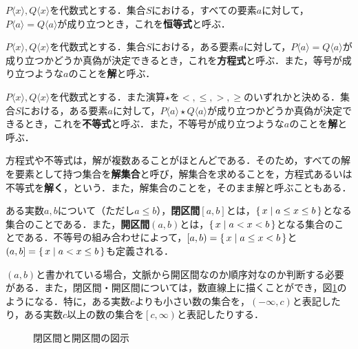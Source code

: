 \begin{definition}[恒等式]
	$P\langle x\rangle, Q\langle x\rangle$を代数式とする．集合$S$における，すべての要素$a$に対して，$P\langle a\rangle = Q\langle a\rangle$が成り立つとき，これを\textbf{恒等式}と呼ぶ．
\end{definition}
\begin{definition}[方程式]
	$P\langle x\rangle, Q\langle x\rangle$を代数式とする．集合$S$における，ある要素$a$に対して，$P\langle a\rangle = Q\langle a\rangle$が成り立つかどうか真偽が決定できるとき，これを\textbf{方程式}と呼ぶ．また，等号が成り立つような$a$のことを\textbf{解}と呼ぶ．
\end{definition}
\begin{definition}[不等式]
	$P\langle x\rangle, Q\langle x\rangle$を代数式とする．また演算$\star$を$<, \leq, >, \geq$のいずれかと決める．集合$S$における，ある要素$a$に対して，$P\langle a\rangle \star Q\langle a\rangle$が成り立つかどうか真偽が決定できるとき，これを\textbf{不等式}と呼ぶ．また，不等号が成り立つような$a$のことを\textbf{解}と呼ぶ．
\end{definition}
\begin{rem*}
	方程式や不等式は，解が複数あることがほとんどである．そのため，すべての解を要素として持つ集合を\textbf{解集合}と呼び，解集合を求めることを，方程式あるいは不等式を\textbf{解く}，という\footnotemark[2]．また，解集合のことを，そのまま解と呼ぶこともある．
\end{rem*}
\begin{definition}
	ある実数$a, b$について（ただし$a \leq b$），\textbf{閉区間}$\left[a, b\right]$とは，$\left\{\,x \mid a \leq x \leq b\,\right\}$となる集合のことである．また，\textbf{開区間}$\left(a, b\right)$とは，$\left\{\,x \mid a < x < b\,\right\}$となる集合のことである．不等号の組み合わせによって，$\left[a, b\right) = \left\{\,x \mid a \leq x < b\,\right\}$と$\left(a, b\right] = \left\{\,x \mid a < x \leq b\,\right\}$も定義される．
\end{definition}
\begin{rem*}
	$\left(a, b\right)$と書かれている場合，文脈から開区間なのか順序対なのか判断する必要がある．また，閉区間・開区間については，数直線上に描くことができ，図\ref{fig:interval}のようになる．特に，ある実数$c$よりも小さい数の集合を，$\left(-\infty, c\right)$と表記したり，ある実数$c$以上の数の集合を$\left[c, \infty\right)$と表記したりする．
	
	\vfill
	\begin{figure}[!h]
		\caption{閉区間と開区間の図示}
		\label{fig:interval}
	\end{figure}
\end{rem*}
\clearpage


